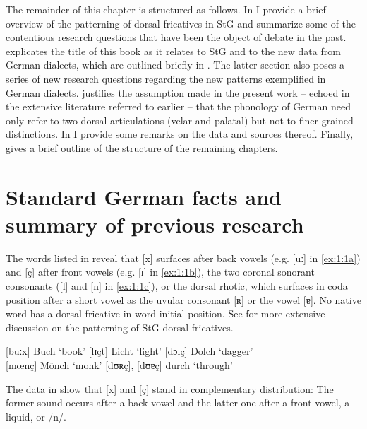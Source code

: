 The remainder of this chapter is structured as follows. In  I provide a brief overview of the patterning of dorsal fricatives in StG and summarize some of the contentious research questions that have been the object of debate in the past.  explicates the title of this book as it relates to StG and to the new data from German dialects, which are outlined briefly in . The latter section also  poses a series of new research questions regarding the new patterns exemplified in German dialects.  justifies the assumption made in the present work -- echoed in the extensive literature referred to earlier -- that the phonology of German need only refer to two dorsal articulations (velar and palatal) but not to finer-grained distinctions. In  I provide some remarks on the data and sources thereof. Finally,  gives a brief outline of the structure of the remaining chapters. 

\section{Standard German facts and summary of previous research}\label{sec:1.2}

The words listed in  reveal that [x] surfaces after back vowels (e.g. [uː] in \ref{ex:1:1a}) and [ç] after front vowels (e.g. [ɪ] in \ref{ex:1:1b}), the two coronal sonorant consonants ([l] and [n] in \ref{ex:1:1c}), or the dorsal rhotic, which surfaces in coda position after a short vowel as the uvular consonant [ʀ] or the vowel [ɐ]. No native word has a dorsal fricative in word-initial position. See  for more extensive discussion on the patterning of StG dorsal fricatives.

\ea%
    \label{ex:1:1}
\ea{}\label{ex:1:1a}  [buːx]         \tab Buch   \tab ‘book’
\ex{}\label{ex:1:1b}  [lɪçt]         \tab Licht  \tab ‘light’
\ex{}\label{ex:1:1c}  [dɔlç]         \tab Dolch  \tab ‘dagger’\\{}
                      [mœnç]         \tab Mönch  \tab ‘monk’
\ex{}\label{ex:1:1d}  [dʊʀç], [dʊɐç] \tab durch  \tab ‘through’
\z
\z

The data in  show that [x] and [ç] stand in complementary distribution: The former sound occurs after a back vowel and the latter one after a front vowel, a liquid, or /n/. 

